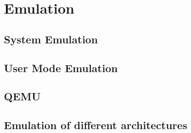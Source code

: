 \chapter{Emulation}\label{ch:emulation}

\section{System Emulation}

\section{User Mode Emulation}

\section{QEMU}

\section{Emulation of different architectures}

\Blindtext
